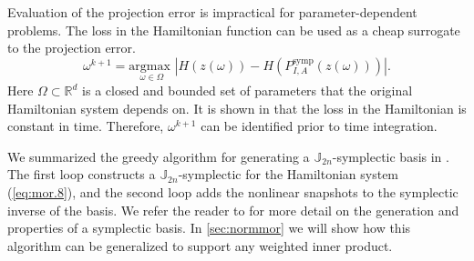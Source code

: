 Evaluation of the projection error is impractical for parameter-dependent problems. The loss in the Hamiltonian function can be used as a cheap surrogate to the projection error.
\begin{equation} \label{eq:mor.16}
	\omega^{k+1} = \underset{\omega \in \Omega}{\text{argmax } } | H(z(\omega)) - H(P^\text{symp}_{I,A}(z(\omega))) |.
\end{equation}
Here $\Omega\subset \mathbb R^{d}$ is a closed and bounded set of parameters that the original Hamiltonian system depends on. It is shown in \cite{doi:10.1137/17M1111991} that the loss in the Hamiltonian is constant in time. Therefore, $\omega^{k+1}$ can be identified prior to time integration.

We summarized the greedy algorithm for generating a $\mathbb J_{2n}$-symplectic basis in . The first loop constructs a $\mathbb J_{2n}$-symplectic for the Hamiltonian system (\ref{eq:mor.8}), and the second loop adds the nonlinear snapshots to the symplectic inverse of the basis. We refer the reader to \cite{doi:10.1137/17M1111991} for more detail on the generation and properties of a symplectic basis. In \cref{sec:normmor} we will show how this algorithm can be generalized to support any weighted inner product.

